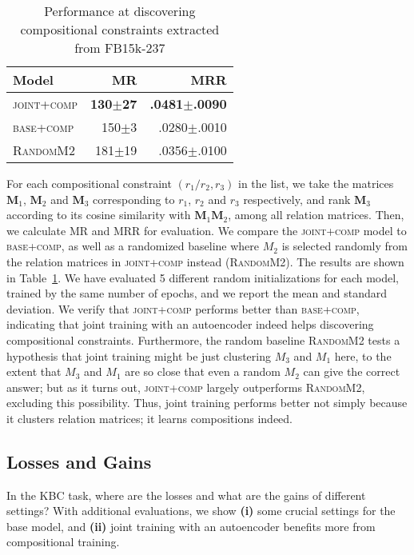 \documentclass[11pt,a4paper]{article}
\newcommand{\mat}[1]{\bm{#1}}
\begin{document}
\begin{table}[!t]
\centering
\small
\setlength{\tabcolsep}{14pt}
\begin{tabular}{lrr}
\toprule
Model & MR & MRR \\
\midrule
\textsc{joint+comp} & \textbf{130$\pm$27} & \textbf{.0481$\pm$.0090} \\ 
\textsc{base+comp} & 150$\pm$3 & .0280$\pm$.0010 \\ 
\textsc{RandomM2} & 181$\pm$19 & .0356$\pm$.0100 \\
\bottomrule
\end{tabular}
\caption{Performance at discovering compositional constraints 
extracted from FB15k-237}
\label{tab:compositional-constraints}
\end{table}

For each compositional constraint $(r_1/r_2, r_3)$ in the list, 
we take the matrices $\mat{M}_1$, $\mat{M}_2$ and $\mat{M}_3$ 
corresponding to $r_1$, $r_2$ and $r_3$ respectively, and 
rank $\mat{M}_3$ according to its cosine similarity with $\mat{M}_1\mat{M}_2$, among all relation 
matrices. Then, we calculate MR and MRR for evaluation. 
We compare the \textsc{joint+comp} model 
to \textsc{base+comp}, as well as a randomized baseline where 
$M_2$ is selected randomly from the relation matrices in \textsc{joint+comp} instead (\textsc{RandomM2}).
The results are shown in Table~\ref{tab:compositional-constraints}. 
We have evaluated 5 different random initializations for each model, trained 
by the same 
number of epochs, and we report the mean and standard deviation. We verify 
that \textsc{joint+comp} performs better than \textsc{base+comp}, 
indicating that 
joint training with an autoencoder indeed helps discovering 
compositional constraints. Furthermore, the random baseline 
\textsc{RandomM2} tests a hypothesis that joint training might be just clustering $M_3$ and $M_1$ here, to the extent that 
$M_3$ and $M_1$ are so close that even 
a random $M_2$ can give the correct answer; but as it turns out, \textsc{joint+comp} largely 
outperforms \textsc{RandomM2}, excluding this possibility. Thus, 
joint training performs better not simply because 
it clusters relation matrices; it learns compositions indeed.

\subsection{Losses and Gains}

In the KBC task, where are the losses and what are the gains of 
different settings?
With additional evaluations, we show \textbf{(i)} some crucial 
settings for the base model, and 
\textbf{(ii)} joint training with an autoencoder benefits more from
compositional training. 
\end{document}
